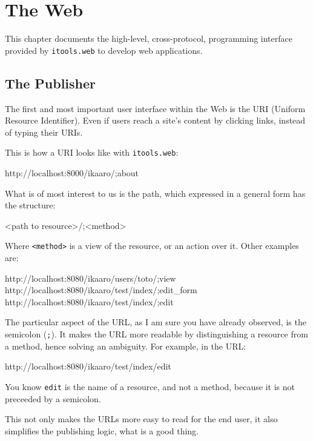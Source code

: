 \chapter{The Web}

This chapter documents the high-level, cross-protocol, programming interface
provided by {\tt itools.web} to develop web applications.


\section{The Publisher}

The first and most important user interface within the Web is the URI
(Uniform Resource Identifier). Even if users reach a site's content by
clicking links, instead of typing their URIs.

 This is how a URI looks
like with {\tt itools.web}:

\begin{code}
    http://localhost:8000/ikaaro/;about
\end{code}

What is of most interest to us is the path, which expressed in a general
form has the structure:

\begin{code}
    <path to resource>/;<method>
\end{code}

Where {\tt <method>} is a view of the resource, or an action over it.
Other examples are:

\begin{code}
    http://localhost:8080/ikaaro/users/toto/;view
    http://localhost:8080/ikaaro/test/index/;edit_form
    http://localhost:8080/ikaaro/test/index/;edit
\end{code}

The particular aspect of the URL, as I am sure you have already observed,
is the semicolon ({\tt ;}). It makes the URL more readable by distinguishing
a resource from a method, hence solving an ambiguity. For example, in the
URL:

\begin{code}
    http://localhost:8080/ikaaro/test/index/edit
\end{code}

You know {\tt edit} is the name of a resource, and not a method, because it
is not preceeded by a semicolon.

This not only makes the URLs more easy to read for the end user, it also
simplifies the publishing logic, what is a good thing.

